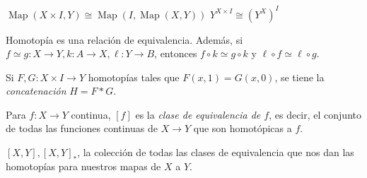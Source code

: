 \begin{tcolorbox}[colback=blue!5!white,colframe=blue!75!blue,title=\textbf{Ley exponencial}.\index{ley exponencial}]
    \(\operatorname{Map}(X\times I, Y)\cong\operatorname{Map}(I, \operatorname{Map}(X, Y))\)
    \tcblower
    \(Y^{X\times I}\cong(Y^X)^I\)
\end{tcolorbox}

\begin{tcolorbox}[colback=blue!5!white,colframe=blue!75!blue,title=\textbf{Proposición}.]
    Homotopía es una relación de equivalencia.
\tcblower
    Además, si \(f\simeq g\colon X\to Y, k\colon A\to X, \ell\colon Y\to B\), entonces \(f\circ k\simeq g\circ k\) y \(\ell\circ f \simeq \ell \circ g\).
\end{tcolorbox}

\begin{tcolorbox}
    Si \(F, G\colon X\times I \to Y\) homotopías tales que \(F(x, 1)=G(x, 0)\), se tiene la \textit{concatenación} \(H=F\ast G\).
\end{tcolorbox}

\begin{tcolorbox}[colback=blue-violet!5!white,colframe=blue-violet!75!black,title=\textbf{Definición}.\index{clase de equivalencia}]
    Para \(f\colon X\to Y\) continua, \([f]\) es la \textit{clase de equivalencia de \(f\)}, es decir, el conjunto de todas las funciones continuas de \(X\to Y\) que son homotópicas a \(f\).
\end{tcolorbox}

\begin{tcolorbox}[colback=antiquefuchsia!15!white,colframe=antiquefuchsia!75!black,title=Notación]    
    \([X, Y], [X, Y]_{\ast}\), la colección de todas las clases de equivalencia que nos dan las homotopías para nuestros mapas de \(X\) a \(Y\).
\end{tcolorbox}

